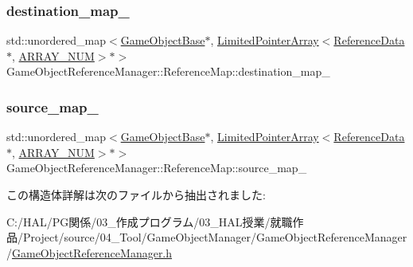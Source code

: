 \subsubsection{\texorpdfstring{destination\+\_\+map\+\_\+}{destination\_map\_}}
{\footnotesize\ttfamily std\+::unordered\+\_\+map$<$\mbox{\hyperlink{class_game_object_base}{Game\+Object\+Base}}$\ast$, \mbox{\hyperlink{class_limited_pointer_array}{Limited\+Pointer\+Array}}$<$\mbox{\hyperlink{struct_game_object_reference_manager_1_1_reference_data}{Reference\+Data}}$\ast$, \mbox{\hyperlink{class_game_object_reference_manager_a962d30b10c5b76353645773b2c1740ce}{A\+R\+R\+A\+Y\+\_\+\+N\+UM}}$>$$\ast$$>$ Game\+Object\+Reference\+Manager\+::\+Reference\+Map\+::destination\+\_\+map\+\_\+}

\mbox{\label{struct_game_object_reference_manager_1_1_reference_map_a971b47dd8f37ba3739ce65a6dfe097ff}} 
\subsubsection{\texorpdfstring{source\+\_\+map\+\_\+}{source\_map\_}}
{\footnotesize\ttfamily std\+::unordered\+\_\+map$<$\mbox{\hyperlink{class_game_object_base}{Game\+Object\+Base}}$\ast$, \mbox{\hyperlink{class_limited_pointer_array}{Limited\+Pointer\+Array}}$<$\mbox{\hyperlink{struct_game_object_reference_manager_1_1_reference_data}{Reference\+Data}}$\ast$, \mbox{\hyperlink{class_game_object_reference_manager_a962d30b10c5b76353645773b2c1740ce}{A\+R\+R\+A\+Y\+\_\+\+N\+UM}}$>$$\ast$$>$ Game\+Object\+Reference\+Manager\+::\+Reference\+Map\+::source\+\_\+map\+\_\+}



この構造体詳解は次のファイルから抽出されました\+:\begin{DoxyCompactItemize}
\item 
C\+:/\+H\+A\+L/\+P\+G関係/03\+\_\+作成プログラム/03\+\_\+\+H\+A\+L授業/就職作品/\+Project/source/04\+\_\+\+Tool/\+Game\+Object\+Manager/\+Game\+Object\+Reference\+Manager/\mbox{\hyperlink{_game_object_reference_manager_8h}{Game\+Object\+Reference\+Manager.\+h}}\end{DoxyCompactItemize}
